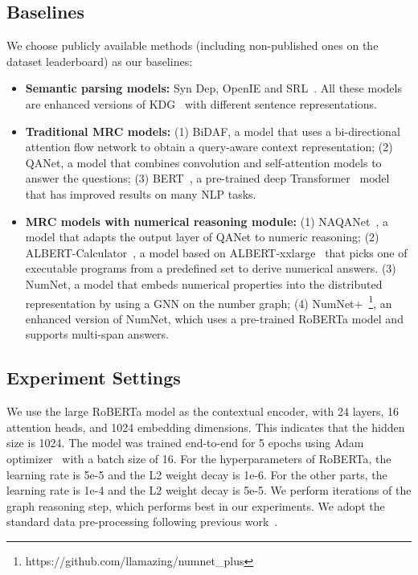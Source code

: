 \documentclass{article}
\begin{document}
\subsection{Baselines}
We choose publicly available methods (including non-published ones on the dataset leaderboard) as our baselines:
\begin{itemize}[leftmargin=*,nolistsep,nosep]
\setlength\itemsep{0.5em}
    \item \textbf{Semantic parsing models:} Syn Dep, OpenIE and SRL~\cite{DBLP:conf/naacl/DuaWDSS019}. All these models are enhanced versions of KDG~\cite{krishnamurthy-etal-2017-kdg} with different sentence representations.
    \item \textbf{Traditional MRC models:} (1) BiDAF, a model that uses a bi-directional attention flow network to obtain a query-aware context representation; (2) QANet, a model that combines convolution and self-attention models to answer the questions; (3) BERT~\cite{devlin-etal-2019-bert}, a pre-trained deep Transformer~\cite{vaswani2017attention} model that has improved results on many NLP tasks.
    \item \textbf{MRC models with numerical reasoning module:} (1) NAQANet~\cite{DBLP:conf/naacl/DuaWDSS019}, a model that adapts the output layer of QANet to numeric reasoning; (2) ALBERT-Calculator~\cite{DBLP:conf/emnlp/AndorHLP19}, a model based on ALBERT-xxlarge~\cite{DBLP:conf/iclr/LanCGGSS20} that picks one of executable programs from a predefined set to derive numerical answers. (3) NumNet, a model that embeds numerical properties into the distributed representation by using a GNN on the number graph; (4) NumNet+~\footnote{https://github.com/llamazing/numnet\_plus}, an enhanced version of NumNet, which uses a pre-trained RoBERTa model and supports multi-span answers. 
\end{itemize} 


\subsection{Experiment Settings}
We use the large RoBERTa model as the contextual encoder, with 24 layers, 16 attention heads, and 1024 embedding dimensions.
This indicates that the hidden size  is 1024.
The model was trained end-to-end for 5 epochs using Adam optimizer~\cite{DBLP:journals/corr/KingmaB14} with a batch size of 16.
For the hyperparameters of RoBERTa, the learning rate is 5e-5 and the L2 weight decay is 1e-6.
For the other parts, the learning rate is 1e-4 and the L2 weight decay is 5e-5.
We perform  iterations of the graph reasoning step, which performs best in our experiments.
We adopt the standard data pre-processing following previous work~\cite{DBLP:conf/emnlp/RanLLZL19}.
\end{document}
